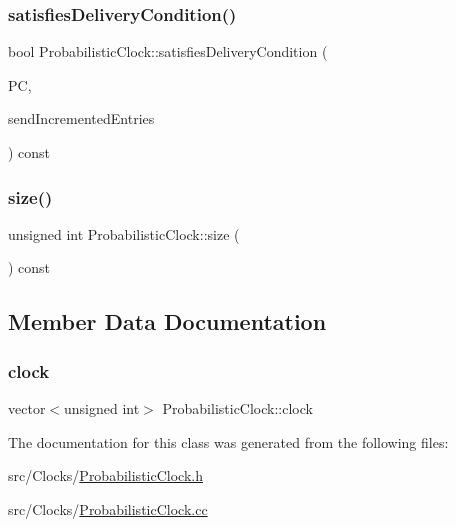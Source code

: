 \mbox{\label{class_probabilistic_clock_a56bced001a856aa04168d787cc2dd549}} 
\subsubsection{\texorpdfstring{satisfies\+Delivery\+Condition()}{satisfiesDeliveryCondition()}}
{\footnotesize\ttfamily bool Probabilistic\+Clock\+::satisfies\+Delivery\+Condition (\begin{DoxyParamCaption}\item[{const \hyperlink{class_probabilistic_clock}{Probabilistic\+Clock} \&}]{PC,  }\item[{const vector$<$ unsigned int $>$ \&}]{send\+Incremented\+Entries }\end{DoxyParamCaption}) const}

\mbox{\label{class_probabilistic_clock_ad0cdbd2ad50309fae0665df4ee5247ba}} 
\subsubsection{\texorpdfstring{size()}{size()}}
{\footnotesize\ttfamily unsigned int Probabilistic\+Clock\+::size (\begin{DoxyParamCaption}{ }\end{DoxyParamCaption}) const}



\subsection{Member Data Documentation}
\mbox{\label{class_probabilistic_clock_a4839958d0e2368cec8bb159b69ac0e76}} 
\subsubsection{\texorpdfstring{clock}{clock}}
{\footnotesize\ttfamily vector$<$unsigned int$>$ Probabilistic\+Clock\+::clock\hspace{0.3cm}{\ttfamily [private]}}



The documentation for this class was generated from the following files\+:\begin{DoxyCompactItemize}
\item 
src/\+Clocks/\hyperlink{_probabilistic_clock_8h}{Probabilistic\+Clock.\+h}\item 
src/\+Clocks/\hyperlink{_probabilistic_clock_8cc}{Probabilistic\+Clock.\+cc}\end{DoxyCompactItemize}
